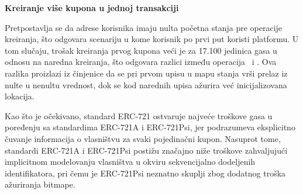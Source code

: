 \begin{description}

\item \textbf{Kreiranje više kupona u jednoj transakciji}

Pretpostavlja se da adrese korisnika imaju nulta početna stanja pre operacije kreiranja, što odgovara scenariju u kome korisnik po prvi put koristi platformu. U tom slučaju, trošak kreiranja prvog kupona veći je za 17.100 jedinica gasa u odnosu na naredna kreiranja, što odgovara razlici između operacija \Sj\ i \Sd. Ova razlika proizlazi iz činjenice da se pri prvom upisu u mapu stanja vrši prelaz iz nulte u nenultu vrednost, dok se kod narednih upisa ažurira već inicijalizovana lokacija.

Kao što je očekivano, standard ERC-721 ostvaruje najveće troškove gasa u poređenju sa standardima ERC-721A i ERC-721Psi, jer podrazumeva eksplicitno čuvanje informacija o vlasništvu za svaki pojedinačni kupon. Nasuprot tome, standardi ERC-721A i ERC-721Psi postižu značajno niže troškove zahvaljujući implicitnom modelovanju vlasništva u okviru sekvencijalno dodeljenih identifikatora, pri čemu je ERC-721Psi neznatno skuplji zbog dodatnog troška ažuriranja bitmape.

\begin{rezultati}[H]
\centering

\begin{minipage}{0.46\textwidth}
\centering


\end{minipage}
\end{rezultati}
\end{description}
